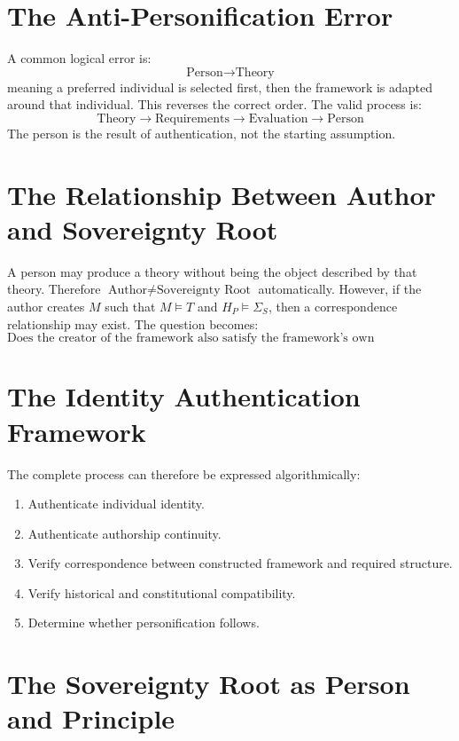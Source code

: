 \documentclass[11pt,openany]{book}
\theoremstyle{plain}
\theoremstyle{definition}
\begin{document}
\section{The Anti-Personification Error}

A common logical error is:
\[
\text{Person} \longrightarrow \text{Theory}
\]
meaning a preferred individual is selected first, then the framework is adapted around that individual. This reverses the correct order. The valid process is:
\[
\text{Theory} \longrightarrow \text{Requirements} \longrightarrow \text{Evaluation} \longrightarrow \text{Person}
\]
The person is the result of authentication, not the starting assumption.

\section{The Relationship Between Author and Sovereignty Root}

A person may produce a theory without being the object described by that theory. Therefore \(\text{Author} \neq \text{Sovereignty Root}\) automatically. However, if the author creates \(M\) such that \(M \models T\) and \(H_P \models \Sigma_S\), then a correspondence relationship may exist. The question becomes:
\[
\boxed{
\text{Does the creator of the framework also satisfy the framework's own authentication conditions?}
}
\]

\section{The Identity Authentication Framework}

The complete process can therefore be expressed algorithmically:
\begin{enumerate}
\item Authenticate individual identity.
\item Authenticate authorship continuity.
\item Verify correspondence between constructed framework and required structure.
\item Verify historical and constitutional compatibility.
\item Determine whether personification follows.
\end{enumerate}

\section{The Sovereignty Root as Person and Principle}
\end{document}
